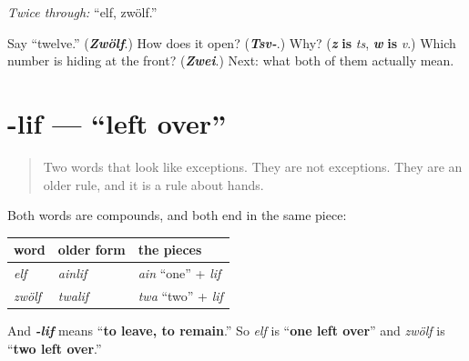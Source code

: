 \emph{Twice through:} \textquotedblleft{}elf, zwölf.\textquotedblright{}

\begin{tcolorbox}[breakable,colback=teal!4,colframe=teal!35!black,title={Before you move on}]
Say \textquotedblleft{}twelve.\textquotedblright{} (\emph{\textbf{Zwölf}}.) How does it open? (\emph{\textbf{Tsv-}}.) Why? (\emph{\textbf{z}} \textbf{is} \emph{ts}, \emph{\textbf{w}} \textbf{is} \emph{v}.) Which number is hiding at the front? (\emph{\textbf{Zwei}}.) Next: what both of them actually mean.
\end{tcolorbox}
\section[-lif]{-lif — \textquotedblleft{}left over\textquotedblright{}}

\label{lesson:GE-C12-lif}



\begin{quote}
Two words that look like exceptions. They are not exceptions. They are an older rule, and it is a rule about hands.
\end{quote}

\begin{cousinweb}
Both words are compounds, and both end in the same piece:

\noindent
\begin{tabularx}{\linewidth}{@{}>{\raggedright\arraybackslash}X>{\raggedright\arraybackslash}X>{\raggedright\arraybackslash}X@{}}
\toprule
\textbf{word} & \textbf{older form} & \textbf{the pieces} \\
\midrule
\emph{elf} & \emph{ainlif} & \emph{ain} \textquotedblleft{}one\textquotedblright{} + \emph{lif} \\
\emph{zwölf} & \emph{twalif} & \emph{twa} \textquotedblleft{}two\textquotedblright{} + \emph{lif} \\
\bottomrule
\end{tabularx}

And \emph{\textbf{-lif}} means \textquotedblleft{}\textbf{to leave, to remain}.\textquotedblright{} So \emph{elf} is \textquotedblleft{}\textbf{one left over}\textquotedblright{} and \emph{zwölf} is \textquotedblleft{}\textbf{two left over}.\textquotedblright{}
\end{cousinweb}

